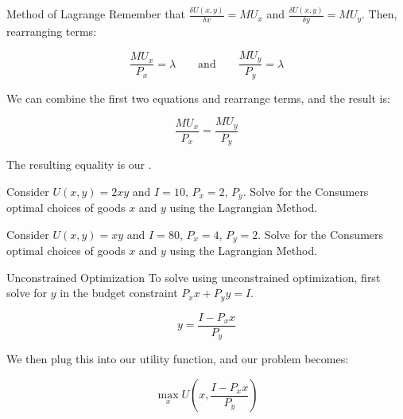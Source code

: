 \documentclass[12pt,t]{beamer}
\begin{document}
\begin{frame}{Method of Lagrange}
  Remember that $\frac{\delta U(x,y)}{\delta x} = MU_x$ and $\frac{\delta U(x,y)}{\delta y} = MU_y$. Then, rearranging terms:

  $$
  \frac{MU_x}{P_x} = \lambda \qquad \text{and} \qquad \frac{MU_y}{P_y} = \lambda
  $$

  \pause\bigskip 
  We can combine the first two equations and rearrange terms, and the result is:

  $$
  \frac{MU_x}{P_x} = \frac{MU_y}{P_y}
  $$
  
  \pause\bigskip
  The resulting equality is our .
\end{frame}

\begin{frame}
  
  \bigskip
  Consider $U(x,y) = 2xy$ and $I=10$, $P_{x} = 2$, $P_{y}$. Solve for the Consumers optimal choices of goods $x$ and $y$ using the Lagrangian Method.
\end{frame}

\begin{frame}
  
  \bigskip
  Consider $U(x,y) = xy$ and $I=80$, $P_{x} = 4$, $P_{y}=2$. Solve for the Consumers optimal choices of goods $x$ and $y$ using the Lagrangian Method.
\end{frame}

\begin{frame}{Unconstrained Optimization}
  To solve using unconstrained optimization, first solve for $y$ in the budget constraint $P_x x + P_y y = I$.

  $$
    y  = \frac{I - P_x x}{P_y} 
  $$

  \pause\bigskip
  We then plug this into our utility function, and our problem becomes:

  $$
    \max_x U(x,\frac{I - P_x x}{P_y}) 
  $$
\end{frame}
\end{document}
